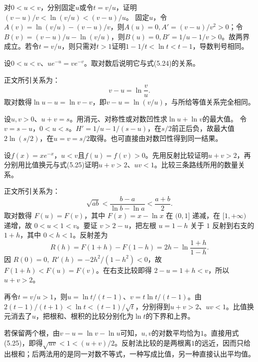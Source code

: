 对\(0<u<v\)，分别固定\(u\)或令\(t=v/u\)，证明\((v-u)/v<\ln(v/u)<(v-u)/u\)。
\solutionanswer
固定\(u\)，令\(A(v)=\ln(v/u)-(v-u)/v\)，则\(A(u)=0,A'=(v-u)/v^2>0\)；令\(B(v)=(v-u)/u-\ln(v/u)\)，则\(B(u)=0,B'=1/u-1/v>0\)。故两界成立。若令\(t=v/u\)，则只需对\(t>1\)证明\(1-1/t<\ln t<t-1\)，导数判号相同。


设\(0<u<v\)、\(ue^{-u}=ve^{-v}\)。取对数后说明它与式\textup{(5.24)}的关系。

\par\smallskip\noindent 正文所引关系为：
\begin{equation*}
v-u=\ln\frac vu.
\end{equation*}
\solutionanswer
取对数得\(\ln u-u=\ln v-v\)，即\(v-u=\ln(v/u)\)，与所给等值关系完全相同。


设\(u,v>0\)、\(u+v=s\)。用消元、对称性或对数凹性求\(\ln u+\ln v\)的最大值。
\solutionanswer
令\(v=s-u\)，\(0<u<s\)。\(H'=1/u-1/(s-u)\)，在\(s/2\)前正后负，故最大值\(2\ln(s/2)\)，在\(u=v=s/2\)取得。也可直接由对数凹性得到同一结果。


设\(f(x)=xe^{-x}\)，\(u<v\)且\(f(u)=f(v)>0\)。先用反射比较证明\(u+v>2\)，再分别用比值换元与式\textup{(5.25)}证明\(u+v>2\)、\(uv<1\)。比较三条路线所用的数量关系。

\par\smallskip\noindent 正文所引关系为：
\begin{equation*}
\sqrt{ab}<\frac{b-a}{\ln b-\ln a}<\frac{a+b}{2}.
\end{equation*}
\solutionanswer
取对数得 \(F(u)=F(v)\)，其中 \(F(x)=x-\ln x\) 在 \((0,1]\) 递减，在 \([1,+\infty)\) 递增，故 \(0<u<1<v\)。要证 \(v>2-u\)，把左根 \(u=1-h\) 关于 \(1\) 反射到右支的 \(1+h\)，其中 \(0<h<1\)。反射差为
\[
 R(h)=F(1+h)-F(1-h)=2h-\ln\frac{1+h}{1-h}.
\]
因 \(R(0)=0,\ R'(h)=-2h^2/(1-h^2)<0\)，故 \(F(1+h)<F(u)=F(v)\)。在右支比较即得 \(2-u=1+h<v\)，所以 \(u+v>2\)。

再令\(t=v/u>1\)，则\(u=\ln t/(t-1)\)、\(v=t\ln t/(t-1)\)。由\(2(t-1)/(t+1)<\ln t<(t-1)/\sqrt t\)，分别得到\(u+v>2\)、\(uv<1\)。比值换元消去了\(u\)，把根和、根积的比较分别化为\(\ln t\)的下界和上界。

若保留两个根，由\(v-u=\ln v-\ln u\)可知，\(u,v\)的对数平均恰为\(1\)。直接用式\textup{(5.25)}，即得\(\sqrt{uv}<1<(u+v)/2\)。反射法比较的是两根离\(1\)的远近，因而只给出根和；后两法用的是同一对数不等式，一种写成比值，另一种直接认出平均值。


